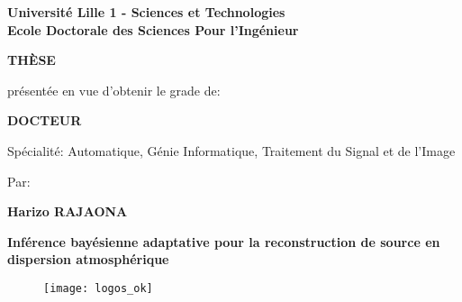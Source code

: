 \thispagestyle{empty}


{\large

\begin{center}

{\bf Université Lille 1 - Sciences et Technologies\\ 
	Ecole Doctorale des Sciences Pour l'Ingénieur} 

\vspace*{0.4cm}

{\large {\bf TH\`ESE}}

\vspace*{0.25cm}

présentée en vue d'obtenir le grade de:

\vspace*{0.25cm}

{\large {\bf DOCTEUR}}

\vspace*{0.25cm}

Spécialité: Automatique, Génie Informatique, Traitement du Signal et de l'Image

\vspace*{0.4cm}

Par:

\vspace*{0.25cm}

{\Large {\bf Harizo RAJAONA}}

\vspace*{1.5cm}



{\huge {\bf Inférence bayésienne adaptative pour la reconstruction de source en dispersion atmosphérique }}

\end{center}


}

\begin{figure}[h!]
	\centering
	\texttt{[image: logos\_ok]}
\end{figure}


